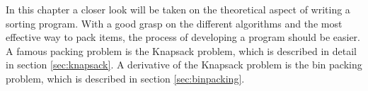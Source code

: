 In this chapter a closer look will be taken on the theoretical aspect of writing a sorting program.
With a good grasp on the different algorithms and the most effective way to pack items, the process of developing a program should be easier. A famous packing problem is the Knapsack problem, which is described in detail in section \ref{sec:knapsack}. A derivative of the Knapsack problem is the bin packing problem, which is described in section \ref{sec:binpacking}.